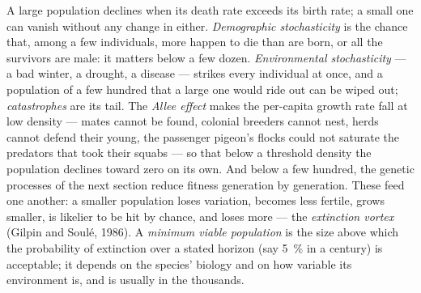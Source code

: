 \begin{definition}\label{def:b3:conservation-biology:small}
A large population declines when its death rate exceeds its birth
rate; a small one can vanish without any change in either.
\emph{Demographic stochasticity} is the chance that, among a few
individuals, more happen to die than are born, or all the survivors are
male: it matters below a few dozen. \emph{Environmental stochasticity}
--- a bad winter, a drought, a disease --- strikes every individual at
once, and a population of a few hundred that a large one would ride out
can be wiped out; \emph{catastrophes} are its tail. The \emph{Allee
effect} makes the per-capita growth rate fall at low density --- mates
cannot be found, colonial breeders cannot nest, herds cannot defend
their young, the passenger pigeon's flocks could not saturate the
predators that took their squabs --- so that below a threshold density
the population declines toward zero on its own. And below a few
hundred, the genetic processes of the next section reduce fitness
generation by generation. These feed one another: a smaller population
loses variation, becomes less fertile, grows smaller, is likelier to
be hit by chance, and loses more --- the \emph{extinction vortex}
(Gilpin and Soulé, 1986). A \emph{minimum viable population} is the
size above which the probability of extinction over a stated horizon
(say \qty{5}{\%} in a century) is acceptable; it depends on the species'
biology and on how variable its environment is, and is usually in the
thousands.
\end{definition}

